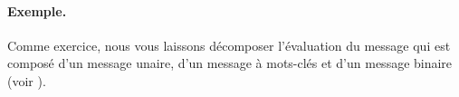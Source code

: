 \documentclass[a4paper,10pt,twoside]{book}
\begin{document}




\paragraph{Exemple.} Comme exercice, nous vous laissons d\'ecomposer
l'\'evaluation du message  qui est compos\'e
d'un message unaire, d'un message \`a mots-cl\'es et d'un message
binaire (voir ).

\end{document}
